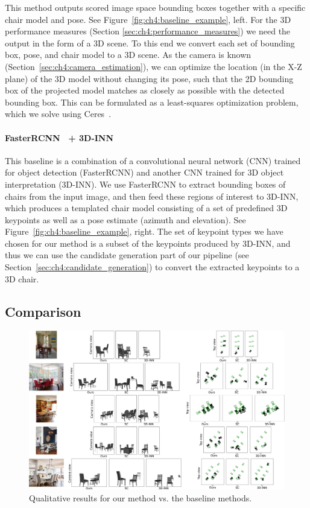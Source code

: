 \documentclass[10pt,twocolumn,letterpaper]{article}
\begin{document}
This method outputs scored image space bounding boxes together with a specific
chair model and pose. See Figure~\ref{fig:ch4:baseline_example}, left. For the 3D
performance measures (Section \ref{sec:ch4:performance_measures}) we need the
output in the form of a 3D scene. To this end we convert each set of bounding
box, pose, and chair model to a 3D scene. As the camera is known
(Section~\ref{sec:ch4:camera_estimation}), we can optimize the location (in the
X-Z plane) of the 3D model without changing its pose, such that the 2D bounding
box of the projected model matches as closely as possible with the detected
bounding box. This can be formulated as a least-squares optimization problem,
which we solve using Ceres~\cite{Ceres}.

\paragraph{FasterRCNN~\cite{Ren:2015:NIPS} + 3D-INN~\cite{Wu:2016:ECCV}} This
baseline is a combination of a convolutional neural network (CNN) trained for
object detection (FasterRCNN) and another CNN trained for 3D object interpretation
(3D-INN). We use FasterRCNN to extract bounding boxes of chairs from the input
image, and then feed these regions of interest to 3D-INN, which produces a
templated chair model consisting of a set of predefined 3D keypoints as well as
a pose estimate (azimuth and elevation).  See Figure~\ref{fig:ch4:baseline_example}, right. 
The set of keypoint types we have chosen for our method is a subset of the keypoints
produced by 3D-INN, and thus we can use the candidate generation part of our pipeline (see Section~\ref{sec:ch4:candidate_generation})
to convert the extracted keypoints to a 3D chair.


\subsection{Comparison}
\begin{figure}[h!tb]
    \centering
    \includegraphics[width=\linewidth]{figures/qualitative_results/qualitative_results.pdf}
    \caption[Qualitative results]{Qualitative results for our method vs. the baseline methods.}
    \label{fig:ch4:qualitative_results}
\end{figure}
\end{document}
